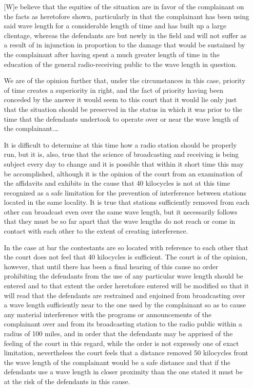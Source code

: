 [W]e believe that the equities of the situation are in favor of the complainant
on the facts as heretofore shown, particularly in that the complainant has been
using said wave length for a considerable length of time and has built up a
large clientage, whereas the defendants are but newly in the field and will not
suffer as a result of in injunction in proportion to the damage that would be
sustained by the complainant after having spent a much greater length of time
in the education of the general radio-receiving public to the wave length in
question.

We are of the opinion further that, under the circumstances in this case,
priority of time creates a superiority in right, and the fact of priority
having been conceded by the answer it would seem to this court that it would
lie only just that the situation should be preserved in the status in which it
was prior to the time that the defendants undertook to operate over or near the
wave length of the complainant.\ldots

It is difficult to determine at this time how a radio station should be properly
run, but it is, also, true that the science of broadcasting and receiving is
being subject every day to change and it is possible that within it short time
this may be accomplished, although it is the opinion of the court from an
examination of the affidavits and exhibits in the cause that 40 kilocycles is
not at this time recognized as a safe limitation for the prevention of
interference between stations located in the same locality. It is true that
stations sufficiently removed from each other can broadcast even over the
same wave length, but it necessarily follows that they must be so far apart
that the wave lengths do not reach or come in contact with each other to the
extent of creating interference.

In the case at bar the contestants are so located with reference to each other
that the court does not feel that 40 kilocycles is sufficient. The court is of
the opinion, however, that until there has been a final hearing of this cause
no order prohibiting the defendants from the use of any particular wave length
should be entered and to that extent the order heretofore entered will be
modified so that it will read that the defendants are restrained and enjoined
from broadcasting over a wave length sufficiently near to the one used by the
complainant so as to cause any material interference with
the programs or announcements of the complainant over and from its broadcasting
station to the radio public within a radius of 100 miles, and in order that the
defendants may be apprised of the feeling of the court in this regard, while
the order is not expressly one of exact limitation, nevertheless the court
feels that a distance removed 50 kilocycles front the wave length of the
complainant would be a safe distance and that if the defendants use a
wave length in closer proximity than the one stated it must be at the risk of
the defendants in this cause.

